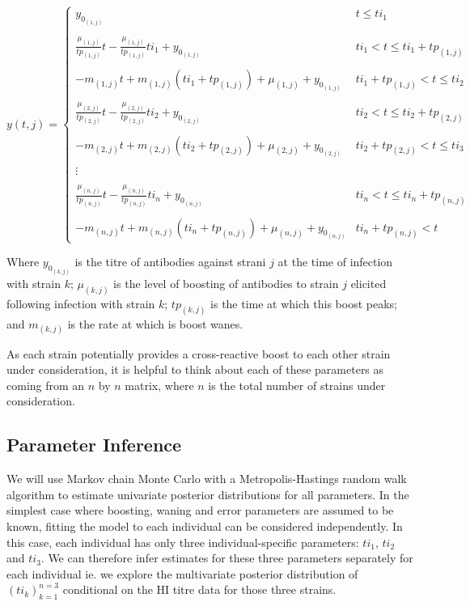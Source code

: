 \documentclass[a4paper,11pt,twoside]{article}
\begin{document}
\begin{equation}
y(t, j) = \left\{
\begin{array}{lr}
y_{0_{(1,j)}} & t \leqslant ti_1\\\\
\frac{\mu_{(1,j)}}{tp_{(1,j)}}t-\frac{\mu_{(1,j)}}{tp_{(1,j)}}ti_1 + y_{0_{(1,j)}} & ti_1 < t \leqslant ti_1 + tp_{(1,j)}\\\\
-m_{(1,j)}t + m_{(1,j)}(ti_1+tp_{(1,j)})+\mu_{(1,j)}+y_{0_{(1,j)}} & ti_1+tp_{(1,j)} < t \leqslant ti_2\\\\
\frac{\mu_{(2,j)}}{tp_{(2,j)}}t-\frac{\mu_{(2,j)}}{tp_{(2,j)}}ti_2 + y_{0_{(2,j)}} & ti_2 < t \leqslant ti_2 + tp_{(2,j)}\\\\
-m_{(2,j)}t + m_{(2,j)}(ti_2+tp_{(2,j)})+\mu_{(2,j)}+y_{0_{(2,j)}} & ti_2+tp_{(2,j)} < t \leqslant ti_3\\\\
\vdots\\\\
\frac{\mu_{(n,j)}}{tp_{(n,j)}}t-\frac{\mu_{(n,j)}}{tp_{(n,j)}}ti_n + y_{0_{(n,j)}} & ti_n < t \leqslant ti_n + tp_{(n,j)}\\\\
-m_{(n,j)}t + m_{(n,j)}(ti_n+tp_{(n,j)})+\mu_{(n,j)}+y_{0_{(n,j)}} & ti_n+tp_{(n,j)} < t
\end{array}
\right.
\end{equation}

Where $y_{0_{(k,j)}}$ is the titre of antibodies against strani $j$ at the time of infection with strain $k$; $\mu_{(k,j)}$ is the level of boosting of antibodies to strain $j$ elicited following infection with strain $k$; $tp_{(k,j)}$ is the time at which this boost peaks; and $m_{(k,j)}$ is the rate at which is boost wanes.

As each strain potentially provides a cross-reactive boost to each other strain under consideration, it is helpful to think about each of these parameters as coming from an $n$ by $n$ matrix, where $n$ is the total number of strains under consideration.

\subsection{Parameter Inference}
We will use Markov chain Monte Carlo with a Metropolis-Hastings random walk algorithm to estimate univariate posterior distributions for all parameters. In the simplest case where boosting, waning and error parameters are assumed to be known, fitting the model to each individual can be considered independently. In this case, each individual has only three individual-specific parameters: $ti_1$, $ti_2$ and $ti_3$. We can therefore infer estimates for these three parameters separately for each individual ie. we explore the multivariate posterior distribution of $(ti_k)_{k=1}^{n=3}$ conditional on the HI titre data for those three strains.
\end{document}
